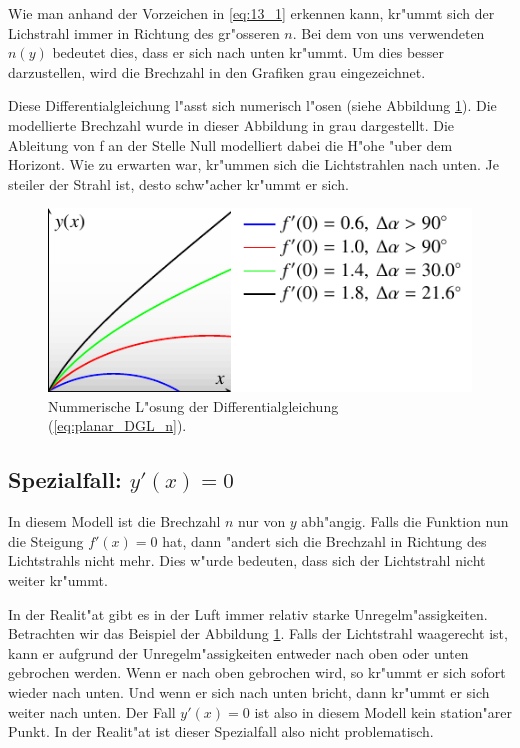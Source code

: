 \begin{refsection}
Wie man anhand der Vorzeichen in \ref{eq:13_1} erkennen kann, kr"ummt sich der Lichstrahl immer in Richtung des gr"osseren $n$.
Bei dem von uns verwendeten $n(y)$ bedeutet dies, dass er sich nach unten kr"ummt. 
Um dies besser darzustellen, wird die Brechzahl in den Grafiken grau eingezeichnet.

Diese Differentialgleichung l"asst sich numerisch l"osen (siehe Abbildung \ref{fig:planares_modell1}).
Die modellierte Brechzahl wurde in dieser Abbildung in grau dargestellt. 
Die Ableitung von f an der Stelle Null modelliert dabei die H"ohe "uber dem Horizont.
Wie zu erwarten war, kr"ummen sich die Lichtstrahlen nach unten.
Je steiler der Strahl ist, desto schw"acher kr"ummt er sich. 

\begin{figure}
  \centering
  \includegraphics{licht/standalone/fig_planar_simulation.pdf}
  \caption{Nummerische L"osung der Differentialgleichung (\ref{eq:planar_DGL_n}). \label{fig:planares_modell1}}
\end{figure}

\subsection{Spezialfall: $y'(x) = 0$} \label{ch:spezialfall}

In diesem Modell ist die Brechzahl $n$ nur von $y$ abh"angig. 
Falls die Funktion nun die Steigung $f'(x) = 0$ hat, dann "andert sich die Brechzahl in Richtung des Lichtstrahls nicht mehr.
Dies w"urde bedeuten, dass sich der Lichtstrahl nicht weiter kr"ummt. 

In der Realit"at gibt es in der Luft immer relativ starke Unregelm"assigkeiten. 
Betrachten wir das Beispiel der Abbildung \ref{fig:planares_modell1}. 
Falls der Lichtstrahl waagerecht ist, kann er aufgrund der Unregelm"assigkeiten entweder nach oben oder unten gebrochen werden. 
Wenn er nach oben gebrochen wird, so kr"ummt er sich sofort wieder nach unten.
Und wenn er sich nach unten bricht, dann kr"ummt er sich weiter nach unten.  
Der Fall $y'(x) = 0$ ist also in diesem Modell kein station"arer Punkt. 
In der Realit"at ist dieser Spezialfall also nicht problematisch. 


\end{refsection}
